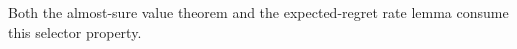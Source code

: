 Both the almost-sure value theorem and the expected-regret rate lemma consume this selector property.
